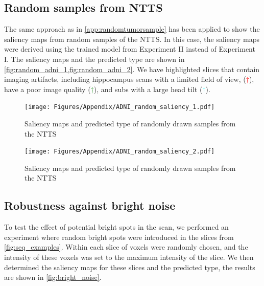 \begin{subappendices}
\clearpage

\subsection{Random samples from \gls{NTTS}}
The same approach as in \cref{app:randomtumorsample} has been applied to show the saliency maps from random samples of the \gls{NTTS}.
In this case, the saliency maps were derived using the trained model from Experiment II instead of Experiment I.
The saliency maps and the predicted \gls{type} are shown in \cref{fig:random_adni_1,fig:random_adni_2}.
We have highlighted \glspl{slice} that contain imaging artifacts, including hippocampus \glspl{scan} with a limited field of view, (\textcolor{red}{$\dagger$}), have a poor image quality (\textcolor{green}{$\dagger$}), and \glspl{sub} with a large head tilt (\textcolor{cyan}{$\dagger$}).


\begin{figure}[ht]
    \centering
    \texttt{[image: Figures/Appendix/ADNI\_random\_saliency\_1.pdf]}

    \caption{Saliency maps and predicted \gls{type} of randomly drawn \glspl{sample} from the \gls{NTTS}}\label{fig:random_adni_1}
\end{figure}

\begin{figure}[ht]
    \centering
    \texttt{[image: Figures/Appendix/ADNI\_random\_saliency\_2.pdf]}

    \caption{Saliency maps and predicted \gls{type} of randomly drawn \glspl{sample} from the \gls{NTTS}}\label{fig:random_adni_2}
\end{figure}


\clearpage


\subsection{Robustness against bright noise}

To test the effect of potential bright spots in the \gls{scan}, we performed an experiment where random bright spots were introduced in the \glspl{slice} from \cref{fig:seq_examples}.
Within each \gls{slice}  of voxels were randomly chosen, and the intensity of these voxels was set to the maximum intensity of the \gls{slice}.
We then determined the saliency maps for these slices and the predicted \gls{type}, the results are shown in \cref{fig:bright_noise}.



\end{subappendices}
